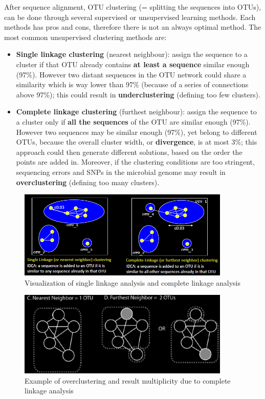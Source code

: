    After sequence alignment, OTU clustering (= splitting the sequences into OTUs), can be done through several supervised or unsupervised learning methods. Each methods has pros and cons, therefore there is not an always optimal method.
    The most common unsupervised clustering methods are:
    \begin{itemize}
      \item \textbf{Single linkage clustering} (nearest neighbour): assign the sequence to a cluster if that OTU already contains \textbf{at least a sequence} similar enough (97\%). However two distant sequences in the OTU network could share a similarity which is way lower than 97\% (because of a series of connections above 97\%); this could result in \textbf{underclustering} (defining too few clusters).
      \item \textbf{Complete linkage clustering} (furthest neighbour): assign the sequence to a cluster only if \textbf{all the sequences} of the OTU are similar enough (97\%). However two sequences may be similar enough (97\%), yet belong to different OTUs, because the overall cluster width, or \textbf{divergence}, is at most 3\%; this approach could then generate different solutions, based on the order the points are added in. Moreover, if the clustering conditions are too stringent, sequencing errors and SNPs in the microbial genome may result in \textbf{overclustering} (defining too many clusters).
    \end{itemize}

    \begin{figure}[!h]
      \centering
      \includegraphics[width=0.9\textwidth]{clustering_methods.png}
      \caption{\label{fig:clustering_methods}Visualization of single linkage analysis and complete linkage analysis}
    \end{figure}

    \begin{figure}[!h]
      \centering
      \includegraphics[width=0.9\textwidth]{overclustering.png}
      \caption{\label{fig:overclustering}Example of overclustering and result multiplicity due to complete linkage analysis}
    \end{figure}

